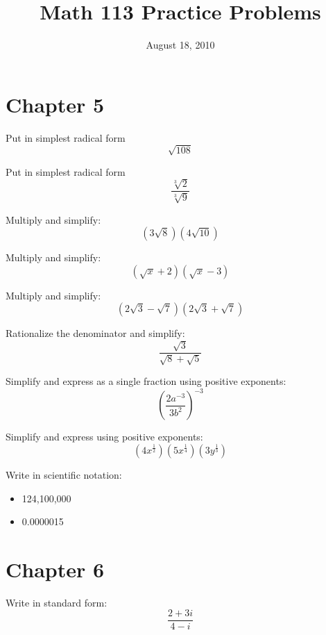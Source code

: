 \documentclass[fleqn,addpoints]{exam}
\title{Math 113 Practice Problems}
\date{August 18, 2010}
\begin{document}
\maketitle

\begin{questions}

\section{Chapter 5}
\question 
Put in simplest radical form
\[
  \sqrt{108}
\]
\vspace{1 cm}

\question 
Put in simplest radical form
\[
  \frac{\sqrt[3]{2}}{\sqrt[3]{9}}
\]
\vspace{2 cm}

\question 
Multiply and simplify:
\[
  (3\sqrt{8})(4\sqrt{10})
\]
\vspace{2 cm}

\question 
Multiply and simplify:
\[
  (\sqrt{x} + 2)(\sqrt{x} - 3)
\]
\vspace{2 cm}

\question 
Multiply and simplify:
\[
  (2\sqrt{3} - \sqrt{7})(2\sqrt{3} + \sqrt{7})
\]
\vspace{2 cm}

\question 
Rationalize the denominator and simplify:
\[
  \frac{\sqrt{3}}{\sqrt{8} + \sqrt{5}}
\]
\vspace{2 cm}

\question 
Simplify and express as a single fraction using positive exponents:
\[
  \left( \frac{2a^{-3}}{3b^2} \right)^{-3}
\]
\vspace{2 cm}

\question 
Simplify and express using positive exponents:
\[
  (4x^{\frac{1}{2}})(5x^{\frac{1}{4}})(3y^{\frac{1}{3}})
\]
\vspace{2 cm}

\question 
Write in scientific notation:
\begin{itemize}
  \item 124,100,000
  \item 0.0000015
\end{itemize}
\vspace{2 cm}

\pagebreak

\section{Chapter 6}

\question 
Write in standard form:
\[
  \frac{2 + 3i}{4 - i}
\]
\vspace{2 cm}


\end{questions}
\end{document}
